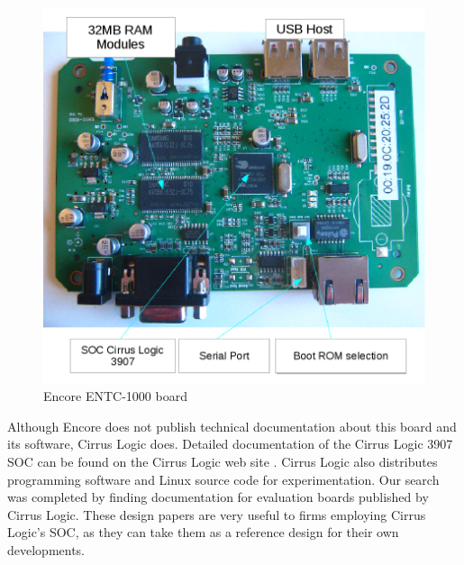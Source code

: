 \documentclass[conference]{IEEEtran}
\newcommand{\nota}[1]{}
\begin{document}
\begin{figure}
\begin{center}
\includegraphics[scale=0.40]{placa-encore-en.png}
\caption{Encore ENTC-1000 board}
\label{fig:placa-encore}
\end{center}
\end{figure}
\nota{
Afortunadamente para nuestra investigación,
la empresa Cirrus publica documentación detallada del SOC Cirrus 3907A \cite{cirrus}.
Junto con esta documentación Cirrus también publica software
para su programación, y código fuente de
Linux para experimentación. Completando la búsqueda, hemos encontrado
documentación de placas de laboratorios experimentales, que la fabrica Cirrus publica.
Estos diseños son muy útiles a las empresas que utilizan el SOC de Cirrus,
ya que lo pueden tomar como diseño de referencia para sus circuitos particulares.
}

Although Encore does not publish technical documentation about this board and its software, Cirrus Logic does. Detailed documentation of the Cirrus Logic 3907 SOC can be found on the Cirrus Logic web site \cite{cirrus}. Cirrus Logic also distributes programming software and Linux source code for experimentation. Our search was completed by finding documentation for evaluation boards published by Cirrus Logic. These design papers are very useful to firms employing Cirrus Logic's SOC, as they can take them as a reference design for their own developments.
\end{document}
